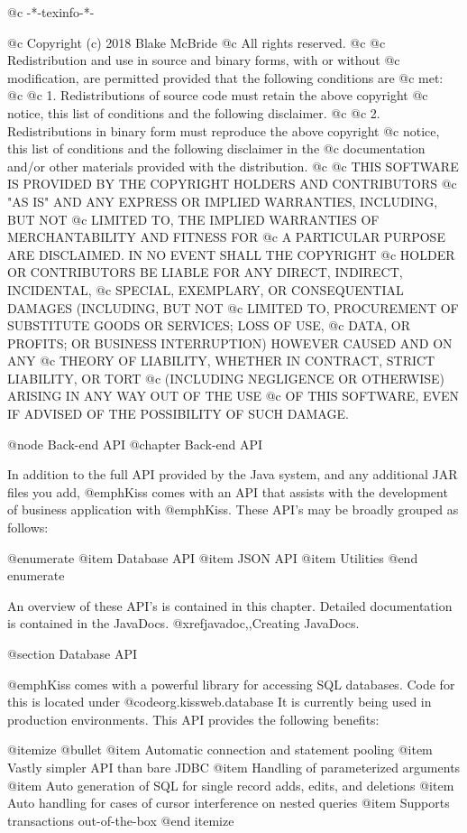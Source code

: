 @c -*-texinfo-*-

@c  Copyright (c) 2018 Blake McBride
@c  All rights reserved.
@c
@c  Redistribution and use in source and binary forms, with or without
@c  modification, are permitted provided that the following conditions are
@c  met:
@c
@c  1. Redistributions of source code must retain the above copyright
@c  notice, this list of conditions and the following disclaimer.
@c
@c  2. Redistributions in binary form must reproduce the above copyright
@c  notice, this list of conditions and the following disclaimer in the
@c  documentation and/or other materials provided with the distribution.
@c
@c  THIS SOFTWARE IS PROVIDED BY THE COPYRIGHT HOLDERS AND CONTRIBUTORS
@c  "AS IS" AND ANY EXPRESS OR IMPLIED WARRANTIES, INCLUDING, BUT NOT
@c  LIMITED TO, THE IMPLIED WARRANTIES OF MERCHANTABILITY AND FITNESS FOR
@c  A PARTICULAR PURPOSE ARE DISCLAIMED. IN NO EVENT SHALL THE COPYRIGHT
@c  HOLDER OR CONTRIBUTORS BE LIABLE FOR ANY DIRECT, INDIRECT, INCIDENTAL,
@c  SPECIAL, EXEMPLARY, OR CONSEQUENTIAL DAMAGES (INCLUDING, BUT NOT
@c  LIMITED TO, PROCUREMENT OF SUBSTITUTE GOODS OR SERVICES; LOSS OF USE,
@c  DATA, OR PROFITS; OR BUSINESS INTERRUPTION) HOWEVER CAUSED AND ON ANY
@c  THEORY OF LIABILITY, WHETHER IN CONTRACT, STRICT LIABILITY, OR TORT
@c  (INCLUDING NEGLIGENCE OR OTHERWISE) ARISING IN ANY WAY OUT OF THE USE
@c  OF THIS SOFTWARE, EVEN IF ADVISED OF THE POSSIBILITY OF SUCH DAMAGE.

@node Back-end API
@chapter Back-end API

In addition to the full API provided by the Java system, and any additional
JAR files you add, @emph{Kiss} comes with an API that assists with the
development of business application with @emph{Kiss}.  These 
API's may be broadly grouped as follows:

@enumerate
@item
Database API
@item
JSON API
@item
Utilities
@end enumerate

An overview of these API's is contained in this chapter.  Detailed
documentation is contained in the JavaDocs.  @xref{javadoc,,Creating JavaDocs}.

@section Database API

@emph{Kiss} comes with a powerful library for accessing SQL databases.
Code for this is located under @code{org.kissweb.database} It is
currently being used in production environments.  This API provides
the following benefits:

@itemize @bullet
@item
Automatic connection and statement pooling
@item
Vastly simpler API than bare JDBC
@item
Handling of parameterized arguments
@item 
Auto generation of SQL for single record adds, edits, and deletions
@item
Auto handling for cases of cursor interference on nested queries
@item
Supports transactions out-of-the-box
@end itemize

